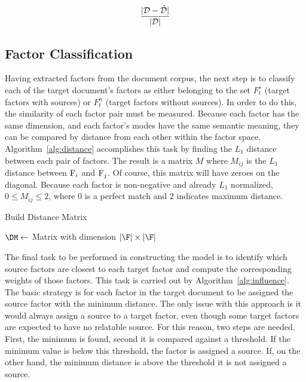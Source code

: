 \documentclass[../ut-dissertation.tex]{subfiles}
\begin{document}
\begin{equation}\label{eq:error_ratio}
  \displaystyle\frac{|\mathcal{D} - \mathcal{\hat{D}}|}{|\mathcal{D}|}
\end{equation}

\subsection{Factor Classification}
Having extracted factors from the document corpus, the next step is to
classify each of the target document's factors as either belonging to
the set $F^s_t$ (target factors with sources) or $F^n_t$ (target
factors without sources).  In order to do this, the similarity of each
factor pair must be measured.  Because each factor has the same
dimension, and each factor's modes have the same semantic meaning,
they can be compared by distance from each other within the factor
space.  Algorithm~\ref{alg:distance} accomplishes this task by finding
the $L_1$ distance between each pair of factors.  The result is a
matrix $M$ where $M_{ij}$ is the $L_1$ distance between $\mathrm{F}_i$
and $\mathrm{F}_j$.  Of course, this matrix will have zeroes on the
diagonal.  Because each factor is non-negative and already $L_1$
normalized, $0 \leq M_{ij} \leq 2$, where 0 is a perfect match and 2
indicates maximum distance.  
\begin{algorithm}
  \caption{Build Distance Matrix}
  \label{alg:distance}
   
  \Input{\F}
  \Output{\DM}
  \BlankLine
  $\DM \leftarrow $ Matrix with dimension $|\F| \times |\F|$\;
  \Return{\DM}
\end{algorithm}

The final task to be performed in constructing the model is to
identify which source factors are closest to each target factor and
compute the corresponding weights of those factors.  This task is
carried out by Algorithm~\ref{alg:influence}.  The basic strategy is
for each factor in the target document to be assigned the source
factor with the minimum distance.  The only issue with this approach
is it would always assign a source to a target factor, even though
some target factors are expected to have no relatable source.  For
this reason, two steps are needed.  First, the minimum is found,
second it is compared against a threshold.  If the minimum value is
below this threshold, the factor is assigned a source.  If, on the
other hand, the minimum distance is above the threshold it is not
assigned a source.
\end{document}
